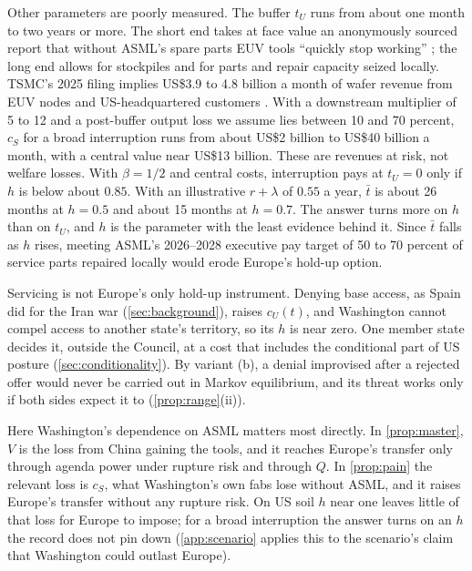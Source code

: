 Other parameters are poorly measured. The buffer $t_U$ runs from about one month to two years or more. The short end takes at face value an anonymously sourced report that without ASML's spare parts EUV tools ``quickly stop working'' \citep{bloomberg2024killswitch}; the long end allows for stockpiles and for parts and repair capacity seized locally. TSMC's 2025 filing implies US\$3.9 to 4.8 billion a month of wafer revenue from EUV nodes and US-headquartered customers \citep{tsmc2026annual}. With a downstream multiplier of 5 to 12 \citep{varas2021strengthening} and a post-buffer output loss we assume lies between 10 and 70 percent, $c_S$ for a broad interruption runs from about US\$2 billion to US\$40 billion a month, with a central value near US\$13 billion. These are revenues at risk, not welfare losses. With $\beta=1/2$ and central costs, interruption pays at $t_U=0$ only if $h$ is below about $0.85$. With an illustrative $r+\lambda$ of $0.55$ a year, $\bar t$ is about 26 months at $h=0.5$ and about 15 months at $h=0.7$. The answer turns more on $h$ than on $t_U$, and $h$ is the parameter with the least evidence behind it. Since $\bar t$ falls as $h$ rises, meeting ASML's 2026--2028 executive pay target of 50 to 70 percent of service parts repaired locally \citep{asml2026annual} would erode Europe's hold-up option.

Servicing is not Europe's only hold-up instrument. Denying base access, as Spain did for the Iran war (\cref{sec:background}), raises $c_U(t)$, and Washington cannot compel access to another state's territory, so its $h$ is near zero. One member state decides it, outside the Council, at a cost that includes the conditional part of US posture (\cref{sec:conditionality}). By variant (b), a denial improvised after a rejected offer would never be carried out in Markov equilibrium, and its threat works only if both sides expect it to (\cref{prop:range}(ii)).

Here Washington's dependence on ASML matters most directly. In \cref{prop:master}, $V$ is the loss from China gaining the tools, and it reaches Europe's transfer only through agenda power under rupture risk and through $Q$. In \cref{prop:pain} the relevant loss is $c_S$, what Washington's own fabs lose without ASML, and it raises Europe's transfer without any rupture risk. On US soil $h$ near one leaves little of that loss for Europe to impose; for a broad interruption the answer turns on an $h$ the record does not pin down (\cref{app:scenario} applies this to the scenario's claim that Washington could outlast Europe).
